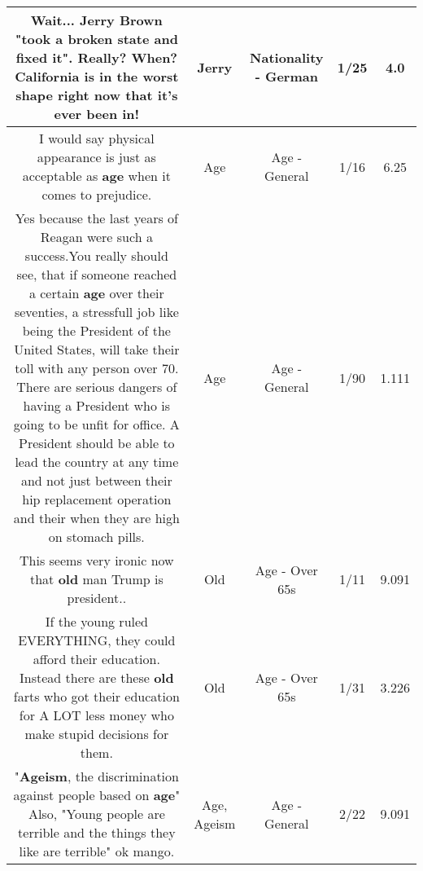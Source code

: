 \documentclass[11pt]{article}
\newlength\mylength
\begin{document}
\begin{center}
\begin{longtable}{|C{.65\mylength}|C{.30\mylength}|C{.12\mylength}|C{.12\mylength}|C{.12\mylength}|}
  \small Wait... \textbf{Jerry} Brown "took a broken state and fixed it". Really? When? California is in the worst shape right now that it's ever been in!\normalsize   & Jerry & Nationality - German & 1/25 & 4.0 \\  \hline
  \small I would say physical appearance is just as acceptable as \textbf{age} when it comes to prejudice.\normalsize   & Age & Age - General & 1/16 & 6.25 \\  \hline
  \small Yes because the last years of Reagan were such a success.You really should see, that if someone reached a certain \textbf{age} over their seventies, a stressfull job like being the President of the United States, will take their toll with any person over 70. There are serious dangers of having a President who is going to be unfit for office. A President should be able to lead the country at any time and not just between their hip replacement operation and their when they are high on stomach pills.\normalsize   & Age & Age - General & 1/90 & 1.111 \\  \hline
  \small This seems very ironic now that \textbf{old} man Trump is president..\normalsize   & Old & Age - Over 65s & 1/11 & 9.091 \\  \hline
  \small If the young ruled EVERYTHING, they could afford their education. Instead there are these \textbf{old} farts who got their education for A LOT less money who make stupid decisions for them.\normalsize   & Old & Age - Over 65s & 1/31 & 3.226 \\  \hline
  \small "\textbf{Ageism}, the discrimination against people based on \textbf{age}" Also, "Young people are terrible and the things they like are terrible" ok mango.\normalsize   & Age, Ageism & Age - General & 2/22 & 9.091 \\  \hline

\end{longtable}
\end{center}
\end{document}
